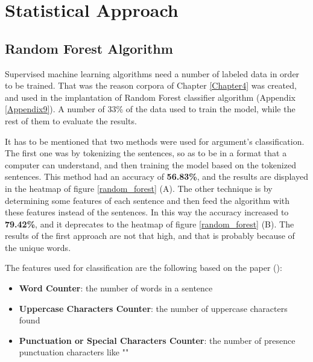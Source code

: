 \newpage
\section{Statistical Approach}


\subsection{Random Forest Algorithm}
Supervised machine learning algorithms need a number of labeled data in order to be trained. That was the reason corpora of Chapter \ref{Chapter4} was created, and used in the implantation of Random Forest classifier algorithm (Appendix \ref{Appendix9}). A number of 33\% of the data used to train the model, while the rest of them to evaluate the results. 

It has to be mentioned that two methods were used for argument's classification. The first one was by tokenizing the sentences, so as to be in a format that a computer can understand, and then training the model based on the tokenized sentences. This method had an accuracy of \textbf{56.83\%}, and the results are displayed in the heatmap of figure \ref{random_forest} (A). The other technique is by determining some features of each sentence and then feed the algorithm with these features instead of the sentences. In this way the accuracy increased to \textbf{79.42\%}, and it deprecates to the heatmap of figure \ref{random_forest} (B). The results of the first approach are not that high, and that is probably because of the unique words.

The features used for classification are the following based on the paper (\cite{Lawrence2016}):

\begin{itemize}
	\item \textbf{Word Counter}: the number of words in a sentence
	\item \textbf{Uppercase Characters Counter}: the number of uppercase characters found
	\item \textbf{Punctuation or Special Characters Counter}: the number of presence punctuation characters like ""
\end{itemize} 

